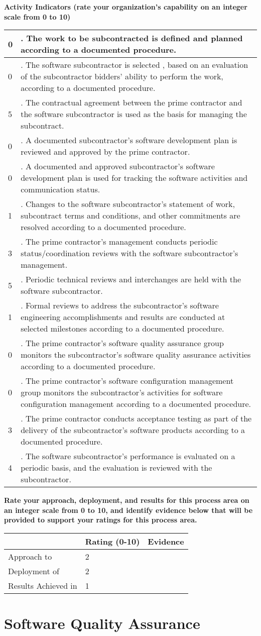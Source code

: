 \documentclass{article}
\newcommand{\KPAname}{}
\newenvironment{KPARate}[1]
	{\renewcommand{\KPAname}{#1}
	 {\bf Rate your approach, deployment, and results for
	  this process area on an integer scale from 0 to 10, and 
	  identify evidence below that will be provided to support your
	  ratings for this process area.}
	 \begin{center}
	 \begin{tabular}{|p{1.0in}|p{0.5in}|p{5.0in}|} \hline
	 & Rating (0-10) & \multicolumn{1}{c|}{Evidence} \\ \hline}
	{\end{tabular}
	 \end{center}}
\newcommand{\Approach}[2]{Approach to \KPAname & #1 & #2 \\ \hline}
\newcommand{\Deployment}[2]{Deployment of \KPAname & #1 & #2 \\ \hline}
\newcommand{\Results}[2]{Results Achieved in \KPAname & #1 & #2 \\
	\hline}
\newcounter{activity}
\newenvironment{KPAActivity}
	{
	 \setcounter{activity}{0}
	 {\bf Activity Indicators (rate your organization's capability
	 on an integer scale from 0 to 10)}
	 \begin{center}
	 \begin{tabular}{|p{0.5in}|p{6.0in}|} \hline
	}
	{
	 \end{tabular}
	 \end{center}
	}
\newcommand{\Activity}[2]{\stepcounter{activity} #1 &
\arabic{activity}. #2 \\ \hline}
\begin{document}
\begin{KPAActivity}
\Activity{0}{The work to be subcontracted is defined and planned
according to a documented procedure.}
\Activity{0}{The software subcontractor is selected , based on an
evaluation of the subcontractor bidders' ability to perform the work,
according to a documented procedure.}
\Activity{5}{The contractual agreement between the prime contractor
and the software subcontractor is used as the basis for managing the
subcontract.} 
\Activity{0}{A documented subcontractor's software development plan is
reviewed and approved by the prime contractor.}
\Activity{0}{A documented and approved subcontractor's software
development plan is used for tracking the software activities and
communication status.}
\Activity{1}{Changes to the software subcontractor's statement of
work, subcontract terms and conditions, and other commitments are
resolved according to a documented procedure.}
\Activity{3}{The prime contractor's management conducts periodic
status/coordination reviews with the software subcontractor's
management.}
\Activity{5}{Periodic technical reviews and interchanges are held with
the software subcontractor.}
\Activity{1}{Formal reviews to address the subcontractor's software
engineering accomplishments and results are conducted at selected
milestones according to a documented procedure.}
\Activity{0}{The prime contractor's software quality assurance group
monitors the subcontractor's software quality assurance activities
according to a documented procedure.}
\Activity{0}{The prime contractor's software configuration management
group monitors the subcontractor's activities for software
configuration management according to a documented procedure.}
\Activity{3}{The prime contractor conducts acceptance testing as part
of the delivery of the subcontractor's software products according to
a documented procedure.}
\Activity{4}{The software subcontractor's performance is evaluated on
a periodic basis, and the evaluation is reviewed with the subcontractor.} 
\end{KPAActivity}

\begin{KPARate}{Software Subcontract Management}
\Approach{2}{}
\Deployment{2}{}
\Results{1}{}
\end{KPARate}

\newpage
\section{Software Quality Assurance}
\end{document}
